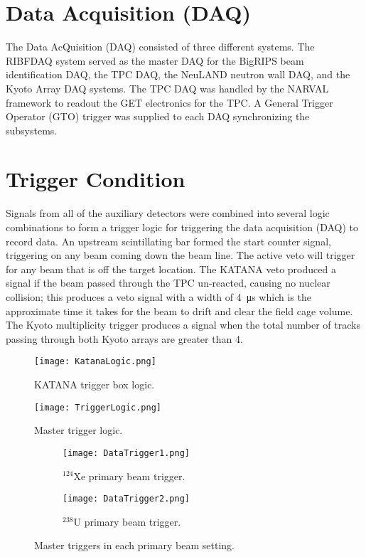 \section{Data Acquisition (DAQ) }
The Data AcQuisition (DAQ) consisted of three different systems. The RIBFDAQ system served as the master DAQ for the BigRIPS beam identification DAQ, the TPC DAQ, the NeuLAND neutron wall DAQ, and the Kyoto Array DAQ systems. The TPC DAQ was handled by the NARVAL framework to readout the GET electronics for the \spirit TPC. A General Trigger Operator (GTO) trigger was supplied to each DAQ synchronizing the subsystems. 

\section{Trigger Condition}
Signals from all of the auxiliary detectors were combined into several logic combinations to form a trigger logic for triggering the data acquisition  (DAQ) to record data. An upstream scintillating bar formed the start counter signal, triggering on any beam coming down the beam line. The active veto will trigger for any beam that is off the target location. The KATANA veto produced a signal if the beam passed through the TPC un-reacted, causing no nuclear collision; this produces a veto signal with a width of \SI{4}{\micro\second} which is the approximate time it takes for the beam to drift and clear the field cage volume. The Kyoto multiplicity trigger produces a signal when the total number of tracks passing through both Kyoto arrays are greater than 4. 


\begin{figure}[!htb]
\texttt{[image: KatanaLogic.png]}
\caption{KATANA trigger box logic.}
\label{fig:katanaLogic}
\end{figure}

\begin{figure}[!htb]
\texttt{[image: TriggerLogic.png]} 
\caption{Master trigger logic.}
\label{fig:trigLogic} 
\end{figure}



\begin{figure}[!htb]
    \centering
    \begin{subfigure}[t]{0.45\textwidth}
        \centering
        \texttt{[image: DataTrigger1.png]} 
        \caption{${}^{124}$Xe primary beam trigger.} \label{fig:dataTrigger1}
    \end{subfigure}
    \hfill
    \begin{subfigure}[t]{0.45\textwidth}
        \centering
        \texttt{[image: DataTrigger2.png]} 
        \caption{${}^{238}$U primary beam trigger.} \label{fig:dataTrigger2}
    \end{subfigure}
\caption{Master triggers in each primary beam setting.}    
\label{fig:datatrigger}
\end{figure}


